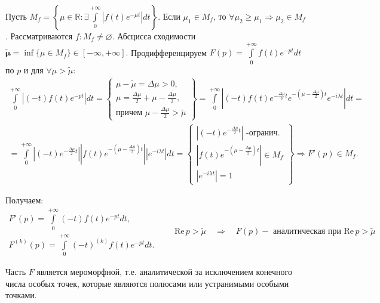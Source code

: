 	Пусть $M_f = \left\{ \mu \in \mathbb{R}: \exists \int\limits_{0}^{+\infty}|f(t)e^{-\mu t}|dt \right \}$. 
	Если $\mu_1\in M_f$, то $\forall \mu_2\geqslant \mu_1 \Rightarrow \mu_2 \in M_f$. \newline
	Рассматриваются $f: M_f \neq \varnothing$. Абсцисса сходимости $\boldsymbol{\widetilde{\mu}} 
		\boldsymbol{= }\inf\{ \mu \in M_f\} \in [-\infty,+\infty].$ \newline
	Продифференцируем $F(p)=\int\limits_{0}^{+\infty}f(t) e^{-pt}dt$ по $p$ и для $\forall\mu>\widetilde{\mu}$:
	$$
		\begin{gathered}
			\int\limits_{0}^{+\infty} \left|(-t)f(t) e^{-pt}\right|dt  = 
						\begin{Bmatrix}	
							\mu - \widetilde{\mu} = \Delta \mu >0, \\
							\mu = \frac{\Delta \mu}{2} + \mu - \frac{\Delta \mu}{2}, \\
							\text{причем } \mu - \frac{\Delta \mu}{2} > \widetilde{\mu}
						\end{Bmatrix} 
						= \int\limits_{0}^{+\infty}  \left|(-t) f(t) e^{-\frac{\Delta \mu}{2} t}
																			e^{-\left(\mu - \frac{\Delta \mu}{2}\right)t}
																			e^{-i\lambda t} \right| dt = \\
						= \int\limits_{0}^{+\infty}  \left|(-t)e^{-\frac{\Delta \mu}{2} t} \right|
																   \left|  f(t) e^{-\left(\mu - \frac{\Delta \mu}{2}\right)t} \right|
																 	\left|	e^{-i\lambda t} \right| dt =
												\begin{Bmatrix}	
													\left|(-t)e^{-\frac{\Delta \mu}{2} t} \right| \text{ -огранич.}\\
													\left|  f(t) e^{-\left(\mu - \frac{\Delta \mu}{2}\right)t} \right| \in M_f \\
													\left|	e^{-i\lambda t} \right| = 1
												\end{Bmatrix} \Rightarrow F'(p) \in M_f.
		\end{gathered}	
	$$
	 
	Получаем:
	$$
		\begin{gathered}
			F'(p) = \int\limits_{0}^{+\infty} (-t)f(t) e^{-pt}dt, \\
			F^{(k)}(p)=  \int\limits_{0}^{+\infty} (-t)^{(k)}f(t) e^{-pt}dt. 
		\end{gathered}\qquad \textrm{Re}\, p > \widetilde\mu \quad \Rightarrow \quad
					 F(p) - \text{ аналитическая при }\textrm{Re}\, p > \widetilde\mu
	$$
		
		Часть $F$ является мероморфной, т.е. аналитической за исключением конечного числа особых точек,
		которые являются полюсами или устранимыми особыми точками. \newline
	

